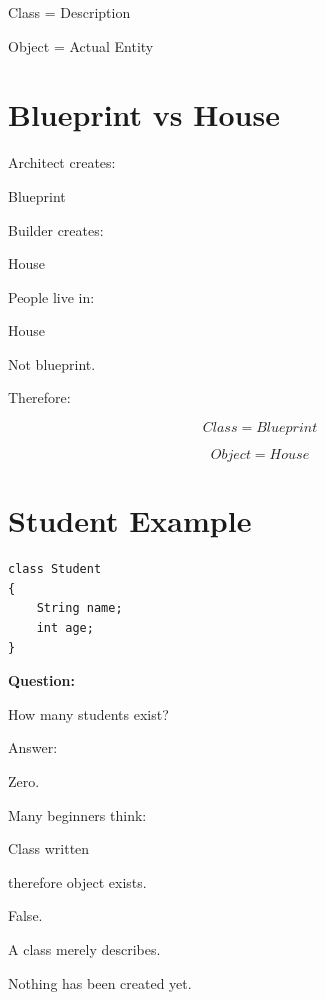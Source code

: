 \documentclass[11pt,a4paper]{book}
\begin{document}
\begin{center}

Class
=
Description

\vspace{1em}

Object = Actual Entity

\end{center}


\section{Blueprint vs House}

\begin{mentalmodel}

Architect creates:

Blueprint

Builder creates:

House

People live in:

House

Not blueprint.

\end{mentalmodel}

\vspace{1em}

Therefore:

\[
Class
=
Blueprint
\]

\[
Object
=
House
\]


\section{Student Example}

\begin{verbatim}
class Student
{
    String name;
    int age;
}
\end{verbatim}

\textbf{Question:}

How many students exist?

Answer:

Zero.

\begin{trap}

Many beginners think:

Class written

therefore object exists.

False.

A class merely describes.

Nothing has been created yet.

\end{trap}
\end{document}
